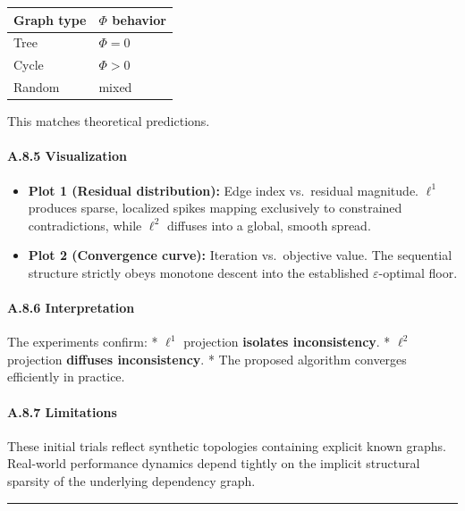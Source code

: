 \documentclass[
]{article}
\providecommand{\tightlist}{%
  \setlength{\itemsep}{0pt}\setlength{\parskip}{0pt}}
\begin{document}
\begin{longtable}[]{@{}ll@{}}
\toprule\noalign{}
Graph type & \(\Phi\) behavior \\
\midrule\noalign{}
\endhead
\bottomrule\noalign{}
\endlastfoot
Tree & \(\Phi = 0\) \\
Cycle & \(\Phi > 0\) \\
Random & mixed \\
\end{longtable}

This matches theoretical predictions.

\paragraph{A.8.5 Visualization}\label{a.8.5-visualization}

\begin{itemize}
\tightlist
\item
  \textbf{Plot 1 (Residual distribution):} Edge index vs.~residual
  magnitude. \(\ell^1\) produces sparse, localized spikes mapping
  exclusively to constrained contradictions, while \(\ell^2\) diffuses
  into a global, smooth spread.
\item
  \textbf{Plot 2 (Convergence curve):} Iteration vs.~objective value.
  The sequential structure strictly obeys monotone descent into the
  established \(\varepsilon\)-optimal floor.
\end{itemize}

\paragraph{A.8.6 Interpretation}\label{a.8.6-interpretation}

The experiments confirm: * \(\ell^1\) projection \textbf{isolates
inconsistency}. * \(\ell^2\) projection \textbf{diffuses inconsistency}.
* The proposed algorithm converges efficiently in practice.

\paragraph{A.8.7 Limitations}\label{a.8.7-limitations}

These initial trials reflect synthetic topologies containing explicit
known graphs. Real-world performance dynamics depend tightly on the
implicit structural sparsity of the underlying dependency graph.

\begin{center}\rule{0.5\linewidth}{0.5pt}\end{center}
\end{document}
